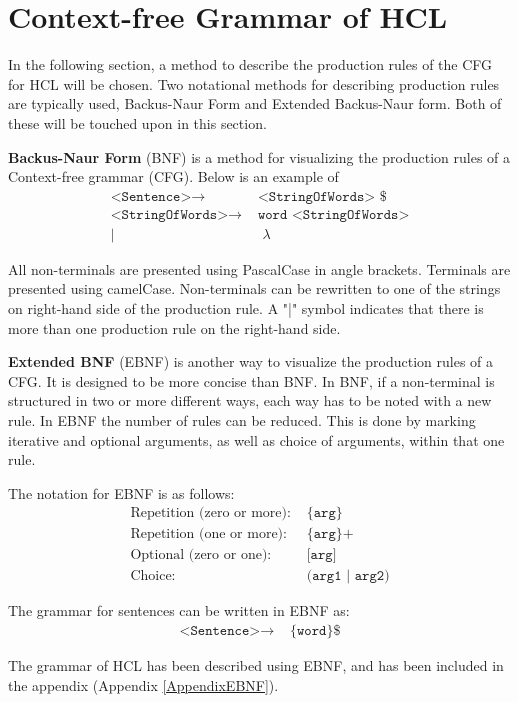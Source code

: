 \section{Context-free Grammar of HCL}
\label{CFGdescription}
In the following section, a method to describe the production rules of the CFG for HCL will be chosen.
Two notational methods for describing production rules are typically used, Backus-Naur Form and Extended Backus-Naur form. 
Both of these will be touched upon in this section.

\textbf{Backus-Naur Form} (BNF) is a method for visualizing the production rules of a Context-free grammar (CFG).
Below is an example of
\begin{align*}
	\texttt{<Sentence>}\to & \texttt{ <StringOfWords> \$}\\
	\texttt{<StringOfWords>}\to & \texttt{ word <StringOfWords>}\\
	| & \texttt{ }\lambda
\end{align*}

All non-terminals are presented using PascalCase in angle brackets.
Terminals are presented using camelCase.
Non-terminals can be rewritten to one of the strings on right-hand side of the production rule.
A "|" symbol indicates that there is more than one production rule on the right-hand side.

\textbf{Extended BNF} (EBNF) is another way to visualize the production rules of a CFG.
It is designed to be more concise than BNF.
In BNF, if a non-terminal is structured in two or more different ways, each way has to be noted with a new rule.
In EBNF the number of rules can be reduced.
This is done by marking iterative and optional arguments, as well as choice of arguments, within that one rule.
\cite{SebestaEBNF}

The notation for EBNF is as follows:
\begin{align*}
	\text{Repetition (zero or more):} & \texttt{ \{arg\}}\\
	\text{Repetition (one or more):} & \texttt{ \{arg\}+}\\
	\text{Optional (zero or one):} & \texttt{ [arg]}\\
	\text{Choice:} & \texttt{ (arg1 | arg2)}
\end{align*}

The grammar for sentences can be written in EBNF as:
\begin{align*}
	\texttt{<Sentence>}\to & \texttt{ \{word\} \$}
\end{align*}

The grammar of HCL has been described using EBNF, and has been included in the appendix (Appendix \ref{AppendixEBNF}).